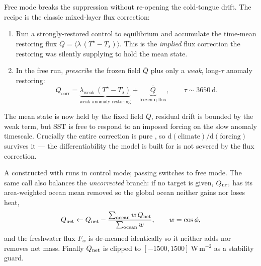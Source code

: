 Free mode breaks the suppression without re-opening the cold-tongue drift. The
recipe is the classic mixed-layer flux correction:
\begin{enumerate}
  \item Run a strongly-restored control to equilibrium and accumulate the
        time-mean restoring flux $\bar{Q} = \langle \lambda\,(T^{\star}-T_s)\rangle$.
        This is the \emph{implied} flux correction the restoring was silently
        supplying to hold the mean state.
  \item In the free run, \emph{prescribe} the frozen field $\bar{Q}$ plus only a
        \emph{weak}, long-$\tau$ anomaly restoring:
        \begin{equation}
          Q_{\mathrm{corr}} = \underbrace{\lambda_{\mathrm{weak}}\,(T^{\star}-T_s)}_{\text{weak anomaly restoring}} + \underbrace{\bar{Q}}_{\text{frozen q-flux}},
          \qquad \tau \sim 3650\ \mathrm{d}.
          \label{eq:qflux}
        \end{equation}
\end{enumerate}
The mean state is now held by the fixed field $\bar{Q}$, residual drift is bounded
by the weak term, but SST is free to respond to an imposed forcing on the slow
anomaly timescale. Crucially the entire correction is pure \jax{}, so
$\mathrm{d}(\text{climate})/\mathrm{d}(\text{forcing})$ survives it --- the
differentiability the model is built for is not severed by the flux correction.

\begin{example}
A  constructed with 
runs in control mode; passing 
switches to free mode. The same call also balances the \emph{uncorrected} branch:
if no target is given, $Q_{\mathrm{net}}$ has its area-weighted ocean mean removed so the
global ocean neither gains nor loses heat,
\begin{equation}
  Q_{\mathrm{net}} \leftarrow Q_{\mathrm{net}} - \frac{\sum_{\text{ocean}} w\,Q_{\mathrm{net}}}{\sum_{\text{ocean}} w},
  \qquad w = \cos\phi,
\end{equation}
and the freshwater flux $F_w$ is de-meaned identically so it neither adds nor
removes net mass. Finally $Q_{\mathrm{net}}$ is clipped to $[-1500,1500]\ \mathrm{W\,m^{-2}}$
as a stability guard. 
\end{example}


